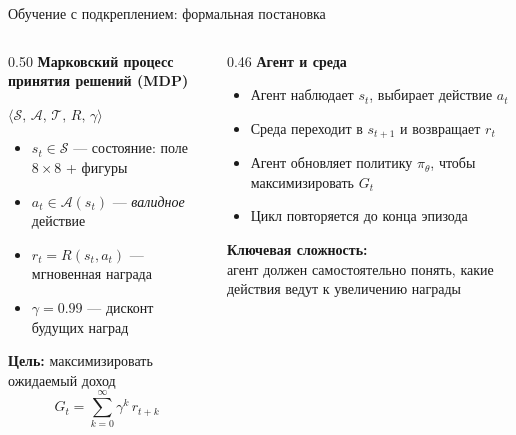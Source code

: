 \documentclass[aspectratio=169]{beamer}
\begin{document}
	\begin{frame}{Обучение с подкреплением: формальная постановка}
		\begin{columns}[t]
			\begin{column}{0.50\textwidth}
				\textbf{Марковский процесс принятия решений (MDP)}
				
				\medskip
				$\langle \mathcal{S},\, \mathcal{A},\, \mathcal{T},\, R,\, \gamma \rangle$
				
				\medskip
				\begin{itemize}
					\item $s_t \in \mathcal{S}$ — состояние: поле $8{\times}8$ + фигуры
					\item $a_t \in \mathcal{A}(s_t)$ — \emph{валидное} действие
					\item $r_t = R(s_t, a_t)$ — мгновенная награда
					\item $\gamma = 0.99$ — дисконт будущих наград
				\end{itemize}
				
				\medskip
				\textbf{Цель:} максимизировать ожидаемый доход
				\[
				G_t = \sum_{k=0}^{\infty} \gamma^k\, r_{t+k}
				\]
			\end{column}
			\begin{column}{0.46\textwidth}
				\textbf{Агент и среда}
				
				\medskip
				\begin{itemize}
					\item Агент наблюдает $s_t$, выбирает действие $a_t$
					\item Среда переходит в $s_{t+1}$ и возвращает $r_t$
					\item Агент обновляет политику $\pi_\theta$, чтобы максимизировать $G_t$
					\item Цикл повторяется до конца эпизода
				\end{itemize}
				
				\medskip
				\textbf{Ключевая сложность:}\\
				агент должен самостоятельно понять, какие действия ведут к увеличению награды
			\end{column}
		\end{columns}
	\end{frame}
	
\end{document}
